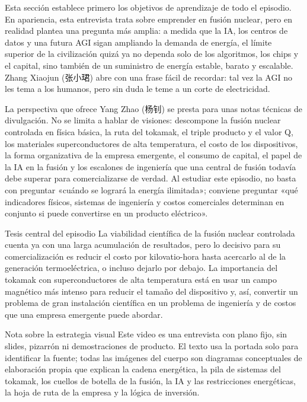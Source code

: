 \documentclass[a4paper]{article}
\begin{document}
Esta sección establece primero los objetivos de aprendizaje de todo el episodio. En apariencia, esta entrevista trata sobre emprender en fusión nuclear, pero en realidad plantea una pregunta más amplia: a medida que la IA, los centros de datos y una futura AGI sigan ampliando la demanda de energía, el límite superior de la civilización quizá ya no dependa solo de los algoritmos, los chips y el capital, sino también de un suministro de energía estable, barato y escalable. Zhang Xiaojun (张小珺) abre con una frase fácil de recordar: tal vez la AGI no les tema a los humanos, pero sin duda le teme a un corte de electricidad.

La perspectiva que ofrece Yang Zhao (杨钊) se presta para unas notas técnicas de divulgación. No se limita a hablar de visiones: descompone la fusión nuclear controlada en física básica, la ruta del tokamak, el triple producto y el valor Q, los materiales superconductores de alta temperatura, el costo de los dispositivos, la forma organizativa de la empresa emergente, el consumo de capital, el papel de la IA en la fusión y los escalones de ingeniería que una central de fusión todavía debe superar para comercializarse de verdad. Al estudiar este episodio, no basta con preguntar «cuándo se logrará la energía ilimitada»; conviene preguntar «qué indicadores físicos, sistemas de ingeniería y costos comerciales determinan en conjunto si puede convertirse en un producto eléctrico».

\begin{importantbox}{Tesis central del episodio}
La viabilidad científica de la fusión nuclear controlada cuenta ya con una larga acumulación de resultados, pero lo decisivo para su comercialización es reducir el costo por kilovatio-hora hasta acercarlo al de la generación termoeléctrica, o incluso dejarlo por debajo. La importancia del tokamak con superconductores de alta temperatura está en usar un campo magnético más intenso para reducir el tamaño del dispositivo y, así, convertir un problema de gran instalación científica en un problema de ingeniería y de costos que una empresa emergente puede abordar.
\end{importantbox}

\begin{knowledgebox}{Nota sobre la estrategia visual}
Este video es una entrevista con plano fijo, sin slides, pizarrón ni demostraciones de producto. El texto usa la portada solo para identificar la fuente; todas las imágenes del cuerpo son diagramas conceptuales de elaboración propia que explican la cadena energética, la pila de sistemas del tokamak, los cuellos de botella de la fusión, la IA y las restricciones energéticas, la hoja de ruta de la empresa y la lógica de inversión.
\end{knowledgebox}
\end{document}
